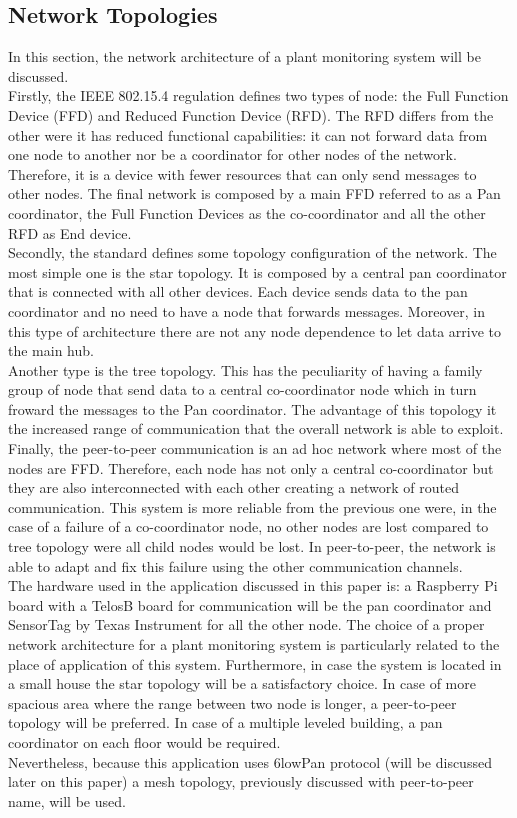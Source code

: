 \subsection{Network Topologies}
In this section, the network architecture of a plant monitoring system will be discussed. \\
Firstly, the IEEE 802.15.4 regulation defines two types of node: the Full Function Device (FFD) and Reduced Function Device (RFD). The RFD differs from the other were it has reduced functional capabilities: it can not forward data from one node to another nor be a coordinator for other nodes of the network. Therefore, it is a device with fewer resources that can only send messages to other nodes. The final network is composed by a main FFD referred to as a Pan coordinator, the Full Function Devices as the co-coordinator and all the other RFD as End device. \cite{802154} \\
Secondly, the standard defines some topology configuration of the network. The most simple one is the star topology. It is composed by a central pan coordinator that is connected with all other devices. Each device sends data to the pan coordinator and no need to have a node that forwards messages. Moreover, in this type of architecture there are not any node dependence to let data arrive to the main hub.\\
Another type is the tree topology. This has the peculiarity of having a family group of node that send data to a central co-coordinator node which in turn froward the messages to the Pan coordinator. The advantage of this topology it the increased range of communication that the overall network is able to exploit.
Finally, the peer-to-peer communication is an ad hoc network where most of the nodes are FFD. Therefore, each node has not only a central co-coordinator but they are also interconnected with each other creating a network of routed communication. This system is more reliable from the previous one were, in the case of a failure of a co-coordinator node, no other nodes are lost compared to tree topology were all child nodes would be lost. In peer-to-peer, the network is able to adapt and fix this failure using the other communication channels.\\
The hardware used in the application discussed in this paper is: a Raspberry Pi board with a TelosB board for communication will be the pan coordinator and SensorTag by Texas Instrument for all the other node. The choice of a proper network architecture for a plant monitoring system is particularly related to the place of application of this system. Furthermore, in case the system is located in a small house the star topology will be a satisfactory choice. In case of more spacious area where the range between two node is longer, a peer-to-peer topology will be preferred. In case of a multiple leveled building, a pan coordinator on each floor would be required.\\
Nevertheless, because this application uses 6lowPan protocol (will be discussed later on this paper) a mesh topology, previously discussed with peer-to-peer name, will be used.
\\




